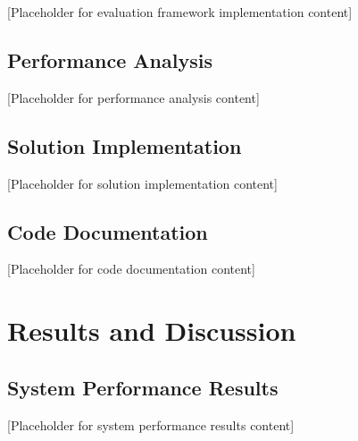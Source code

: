 \documentclass[12pt,a4paper]{article}
\begin{document}

[Placeholder for evaluation framework implementation content]

\subsection{Performance Analysis}


[Placeholder for performance analysis content]


\subsection{Solution Implementation}


[Placeholder for solution implementation content]

\subsection{Code Documentation}


[Placeholder for code documentation content]

\section{Results and Discussion}


\subsection{System Performance Results}


[Placeholder for system performance results content]
\end{document}
